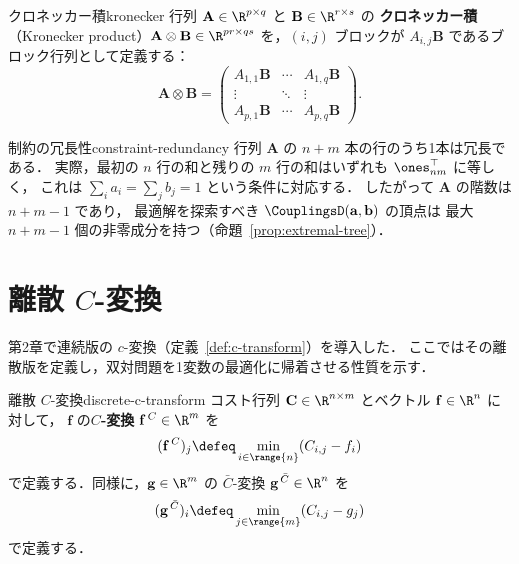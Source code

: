 \begin{definition}{クロネッカー積}{kronecker}
  行列 $\mathbf{A} \in \R^{p \times q}$ と $\mathbf{B} \in \R^{r \times s}$ の
  \textbf{クロネッカー積}（Kronecker product）$\mathbf{A} \otimes \mathbf{B} \in \R^{pr \times qs}$
  を，$(i, j)$ ブロックが $A_{i,j} \mathbf{B}$ であるブロック行列として定義する：
  \[
    \mathbf{A} \otimes \mathbf{B} =
    \begin{pmatrix}
      A_{1,1}\mathbf{B} & \cdots & A_{1,q}\mathbf{B} \\
      \vdots & \ddots & \vdots \\
      A_{p,1}\mathbf{B} & \cdots & A_{p,q}\mathbf{B}
    \end{pmatrix}.
  \]
\end{definition}

\begin{remark}{制約の冗長性}{constraint-redundancy}
  行列 $\mathbf{A}$ の $n + m$ 本の行のうち1本は冗長である．
  実際，最初の $n$ 行の和と残りの $m$ 行の和はいずれも $\ones_{nm}^\top$ に等しく，
  これは $\sum_i a_i = \sum_j b_j = 1$ という条件に対応する．
  したがって $\mathbf{A}$ の階数は $n + m - 1$ であり，
  最適解を探索すべき $\CouplingsD(\mathbf{a}, \mathbf{b})$ の頂点は
  最大 $n + m - 1$ 個の非零成分を持つ（命題~\ref{prop:extremal-tree}）．
\end{remark}

\section{離散 $C$-変換}
\label{sec:discrete-c-transform}

第2章で連続版の $c$-変換（定義~\ref{def:c-transform}）を導入した．
ここではその離散版を定義し，双対問題を1変数の最適化に帰着させる性質を示す．

\begin{definition}{離散 $C$-変換}{discrete-c-transform}
  コスト行列 $\mathbf{C} \in \R^{n \times m}$ とベクトル $\mathbf{f} \in \R^n$ に対して，
  $\mathbf{f}$ の\textbf{$C$-変換} $\mathbf{f}^{\,C} \in \R^m$ を
  \[
    (\mathbf{f}^{\,C})_j \defeq \min_{i \in \range{n}} (C_{i,j} - f_i)
  \]
  で定義する．同様に，$\mathbf{g} \in \R^m$ の $\bar{C}$-変換 $\mathbf{g}^{\,\bar{C}} \in \R^n$ を
  \[
    (\mathbf{g}^{\,\bar{C}})_i \defeq \min_{j \in \range{m}} (C_{i,j} - g_j)
  \]
  で定義する．
\end{definition}

